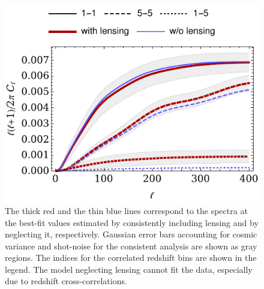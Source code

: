 


\begin{figure}[tp]
  \centering
  \includegraphics[width=\columnwidth]{figures/chapter-mnu/fid_shift.pdf}
  \caption{
    The thick red and the thin blue lines correspond to the spectra at the best-fit values estimated by consistently including lensing and by neglecting it, respectively.
    Gaussian error bars accounting for cosmic variance and shot-noise for the consistent analysis are shown as gray regions.
    The indices for the correlated redshift bins are shown in the legend.
    The model neglecting lensing cannot fit the data, especially due to redshift cross-correlations.
  }
  \label{fig:cl}
\end{figure}


